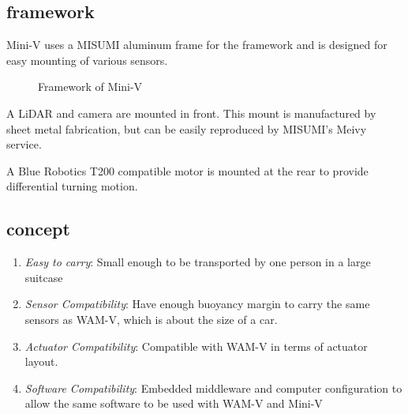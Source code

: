 \documentclass[lettersize,journal]{IEEEtran}
\begin{document}
\subsection{framework}

Mini-V uses a MISUMI aluminum frame for the framework and is designed for easy mounting of various sensors.

\begin{figure}[H]
  \begin{center}
  \end{center}
  \caption{Framework of Mini-V}
  \label{fig:miniv}
\end{figure}

A LiDAR and camera are mounted in front.
This mount is manufactured by sheet metal fabrication, but can be easily reproduced by MISUMI's Meivy service.

A Blue Robotics T200 compatible motor is mounted at the rear to provide differential turning motion.

\subsection{concept}

\begin{enumerate}
  \item {\it Easy to carry}: 
  Small enough to be transported by one person in a large suitcase
    
  \item {\it Sensor Compatibility}: 
  Have enough buoyancy margin to carry the same sensors as WAM-V, which is about the size of a car.

  \item {\it Actuator Compatibility}: 
  Compatible with WAM-V in terms of actuator layout.
  
  \item {\it Software Compatibility}: 
  Embedded middleware and computer configuration to allow the same software to be used with WAM-V and Mini-V
\end{enumerate}
\end{document}

